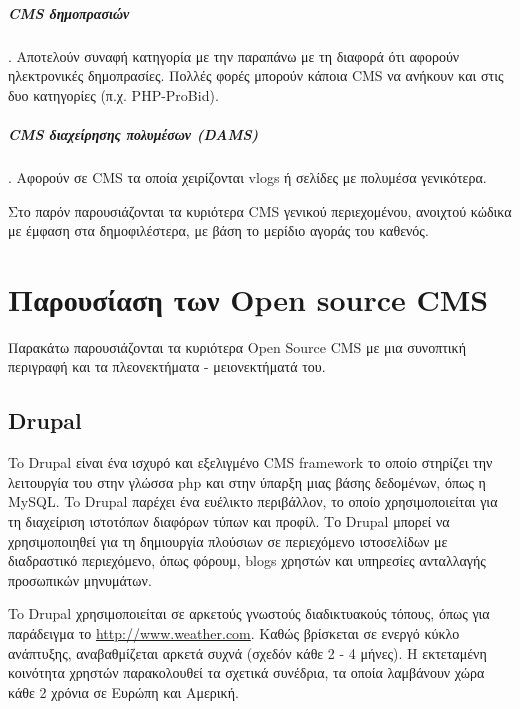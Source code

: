 \documentclass[12pt]{report}
\begin{document}
\paragraph{\textlatin{CMS} δημοπρασιών}. Αποτελούν συναφή κατηγορία με την παραπάνω με τη διαφορά ότι αφορούν ηλεκτρονικές δημοπρασίες. Πολλές φορές μπορούν κάποια \textlatin{CMS} να ανήκουν και στις δυο κατηγορίες (π.χ. \textlatin{PHP-ProBid}).

\paragraph{\textlatin{CMS} διαχείρησης πολυμέσων (\textlatin{DAMS})}. Αφορούν σε \textlatin{CMS} τα οποία χειρίζονται \textlatin{vlogs} ή σελίδες με πολυμέσα γενικότερα.

Στο παρόν παρουσιάζονται τα κυριότερα \textlatin{CMS} γενικού περιεχομένου, ανοιχτού κώδικα με έμφαση στα δημοφιλέστερα, με βάση το μερίδιο αγοράς του καθενός.

\chapter{Παρουσίαση των \textlatin{Open source CMS}}\label{ch2}
Παρακάτω παρουσιάζονται τα κυριότερα \textlatin{Open Source CMS} με μια συνοπτική περιγραφή και τα πλεονεκτήματα - μειονεκτήματά του.

\section{\textlatin{Drupal}}
To \textlatin{Drupal} είναι ένα ισχυρό και εξελιγμένο \textlatin{CMS framework} το οποίο στηρίζει την λειτουργία του στην γλώσσα \textlatin{php} και στην ύπαρξη μιας βάσης δεδομένων, όπως η \textlatin{MySQL}. To  \textlatin{Drupal} παρέχει ένα ευέλικτο περιβάλλον, το οποίο χρησιμοποιείται για τη διαχείριση ιστοτόπων διαφόρων τύπων και προφίλ. Το \textlatin{Drupal} μπορεί να χρησιμοποιηθεί για τη δημιουργία πλούσιων σε περιεχόμενο ιστοσελίδων με διαδραστικό περιεχόμενο, όπως φόρουμ, \textlatin{blogs} χρηστών και υπηρεσίες ανταλλαγής προσωπικών μηνυμάτων.

To \textlatin{Drupal} χρησιμοποιείται σε αρκετούς γνωστούς διαδικτυακούς τόπους, όπως για παράδειγμα το \textlatin{\url{http://www.weather.com}}. Καθώς βρίσκεται σε ενεργό κύκλο ανάπτυξης, αναβαθμίζεται αρκετά συχνά (σχεδόν κάθε 2 - 4 μήνες). Η εκτεταμένη κοινότητα χρηστών παρακολουθεί τα σχετικά συνέδρια, τα οποία λαμβάνουν χώρα κάθε 2 χρόνια σε Ευρώπη και Αμερική.
\end{document}

